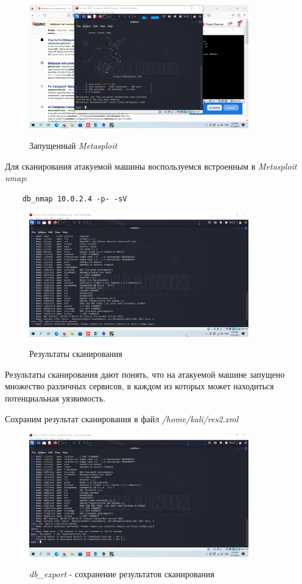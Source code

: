 \documentclass[a4paper]{article}
\begin{document}
  \begin{figure}[H]
    \centering
    \includegraphics[width=0.85\textwidth]{04_0044}
    \label{img:44}
    \caption{Запущенный \textit{Metasploit}}
  \end{figure}

  Для сканирования атакуемой машины воспользуемся встроенным в \textit{Metasploit nmap}:
  \begin{verbatim}
    db_nmap 10.0.2.4 -p- -sV
  \end{verbatim}

  \begin{figure}[H]
    \centering
    \includegraphics[width=0.85\textwidth]{04_0045}
    \label{img:45}
    \caption{Результаты сканирования}
  \end{figure}

  Результаты сканирования дают понять, что на атакуемой машине запущено множество
  различных сервисов, в каждом из которых может находиться потенциальная уязвимость.

  Сохраним результат сканирования в файл \textit{/home/kali/res2.xml}

  \begin{figure}[H]
    \centering
    \includegraphics[width=0.85\textwidth]{04_0046}
    \label{img:46}
    \caption{\textit{db\_export} - сохранение результатов сканирования}
  \end{figure}
\end{document}
